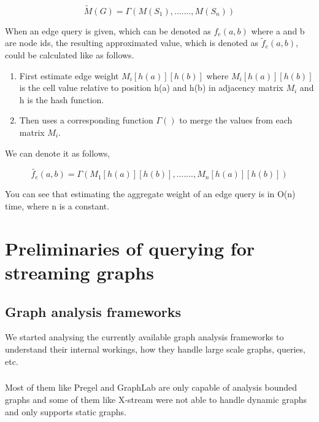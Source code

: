 \documentclass[12pt]{report}
\numberwithin{figure}{section}
\numberwithin{table}{section}
\begin{document}
\paragraph{}

\begin{equation}
\tilde{M}(G) = \Gamma(M(S_1), ......., M(S_n))
\end{equation}

When an edge query is given, which can be denoted as $f_e(a,b)$ where a and b are node ids, the resulting approximated value, which is denoted as $\tilde{f}_e(a,b)$, could be calculated like as follows.

\begin{enumerate}
\item First  estimate edge weight $M_i[h(a)][h(b)] $ where $M_i[h(a)][h(b)]$ is the cell value relative to position h(a) and h(b) in adjacency matrix $M_i$ and h is the hash function.
\item Then uses a corresponding function $\Gamma()$ to merge the values from each matrix $M_i$.
\end{enumerate}
 
We can denote it as follows, 

\begin{equation}
\tilde{f_e}(a,b) = \Gamma(M_1[h(a)][h(b)], ......., M_n[h(a)][h(b)])
\end{equation}

You can see that estimating the aggregate weight of an edge query is in O(n) time, where n is a constant.


\chapter{Preliminaries of querying for streaming graphs}


\section{Graph analysis frameworks}
We started analysing the currently available graph analysis frameworks to understand their internal workings, how they handle large scale graphs, queries, etc.

\paragraph{}

Most of them like Pregel\cite{Pregel} and GraphLab\cite{Graphlab} are only capable of analysis bounded graphs and some of them like X-stream\cite{X-stream} were not able to handle dynamic graphs and only supports static graphs. 
\end{document}
